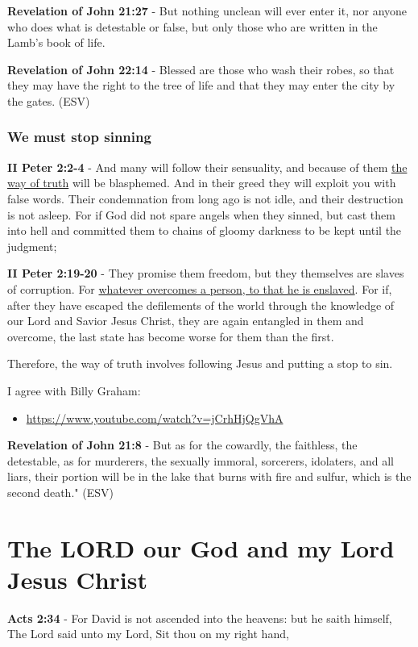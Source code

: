 \documentclass[11pt]{article}
\begin{document}
\textbf{Revelation of John 21:27} - But nothing unclean will ever enter it, nor anyone who does what is detestable or false, but only those who are written in the Lamb's book of life.

\textbf{Revelation of John 22:14} - Blessed are those who wash their robes, so that they may have the right to the tree of life and that they may enter the city by the gates. (ESV)

\subsubsection{We must stop sinning}
\label{sec:orgb1f45f6}

\textbf{II Peter 2:2-4} - And many will follow their sensuality, and because of them \uline{the way of truth} will be blasphemed. And in their greed they will exploit you with false words. Their condemnation from long ago is not idle, and their destruction is not asleep. For if God did not spare angels when they sinned, but cast them into hell and committed them to chains of gloomy darkness to be kept until the judgment;

\textbf{II Peter 2:19-20} - They promise them freedom, but they themselves are slaves of corruption. For \uline{whatever overcomes a person, to that he is enslaved}. For if, after they have escaped the defilements of the world through the knowledge of our Lord and Savior Jesus Christ, they are again entangled in them and overcome, the last state has become worse for them than the first.

Therefore, the way of truth involves following Jesus and putting a stop to sin.

I agree with Billy Graham:
\begin{itemize}
\item \url{https://www.youtube.com/watch?v=jCrhHjQgVhA}
\end{itemize}

\textbf{Revelation of John 21:8} - But as for the cowardly, the faithless, the detestable, as for murderers, the sexually immoral, sorcerers, idolaters, and all liars, their portion will be in the lake that burns with fire and sulfur, which is the second death." (ESV)

\section{The LORD our God and my Lord Jesus Christ}
\label{sec:orgb47b634}
\textbf{Acts 2:34} - For David is not ascended into the heavens: but he saith himself, The Lord said unto my Lord, Sit thou on my right hand,
\end{document}
